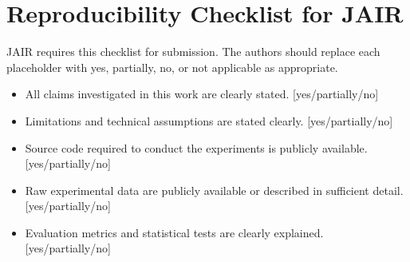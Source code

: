 \documentclass[manuscript, screen, review]{jair}
\begin{document}
\section{Reproducibility Checklist for JAIR}
JAIR requires this checklist for submission. The authors should replace each placeholder with yes, partially, no, or not applicable as appropriate.
\begin{itemize}
\item All claims investigated in this work are clearly stated. [yes/partially/no]
\item Limitations and technical assumptions are stated clearly. [yes/partially/no]
\item Source code required to conduct the experiments is publicly available. [yes/partially/no]
\item Raw experimental data are publicly available or described in sufficient detail. [yes/partially/no]
\item Evaluation metrics and statistical tests are clearly explained. [yes/partially/no]
\end{itemize}
\end{document}
